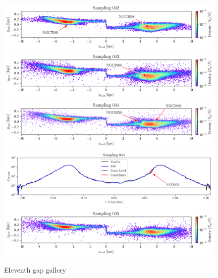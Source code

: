 \documentclass[draft]{aa}
\begin{document}
\begin{appendix}
    \begin{figure}
      \centering
      \includegraphics[width=\linewidth]{gallery_of_gaps_monte-carlo-042.png}
      \includegraphics[width=\linewidth]{gallery_of_gaps_monte-carlo-043.png}
      \includegraphics[width=\linewidth]{gallery_of_gaps_monte-carlo-044.png}
      \includegraphics[width=\linewidth]{tau-profile-monte-carlo-044.png}
      \includegraphics[width=\linewidth]{gallery_of_gaps_monte-carlo-045.png}
      \caption{Eleventh gap gallery}
      \label{fig:gallery010}
    \end{figure}   


\end{appendix}
\end{document}
